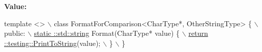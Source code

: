 {\bfseries Value\+:}
\begin{DoxyCode}
\textcolor{keyword}{template} <>                                                           \(\backslash\)
  class FormatForComparison<CharType*, OtherStringType> \{               \(\backslash\)
   public:                                                              \hyperlink{namespacetesting_1_1internal_a8e8ff5b11e64078831112677156cb111}{\(\backslash\)}
\hyperlink{namespacetesting_1_1internal_a8e8ff5b11e64078831112677156cb111}{    static ::std::string} Format(CharType* value) \{                      
      \hyperlink{namespacetesting_aa5717bb1144edd1d262d310ba70c82ed}{\(\backslash\)}
\hyperlink{namespacetesting_aa5717bb1144edd1d262d310ba70c82ed}{      return ::testing::PrintToString}(value);                         
        \(\backslash\)
    \}                                                                   \(\backslash\)
  \}
\end{DoxyCode}
